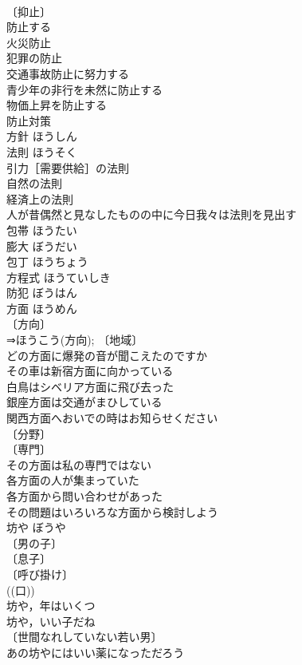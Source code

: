 \documentclass[8pt]{extreport}
\begin{document}
\begin{CJK}{UTF8}{min}
\\	〔抑止〕
\\	防止する 
\\	火災防止 
\\	犯罪の防止 
\\	交通事故防止に努力する 
\\	青少年の非行を未然に防止する 
\\	物価上昇を防止する 
\\	防止対策 
\\	方針	ほうしん	
\\	法則	ほうそく	
\\	引力［需要供給］の法則 
\\	自然の法則 
\\	経済上の法則 
\\	人が昔偶然と見なしたものの中に今日我々は法則を見出す 
\\	包帯	ほうたい	
\\	膨大	ぼうだい	
\\	包丁	ほうちょう	
\\	方程式	ほうていしき	
\\	防犯	ぼうはん	
\\	方面	ほうめん	
\\	〔方向〕
\\	⇒ほうこう(方向); 〔地域〕
\\	どの方面に爆発の音が聞こえたのですか 
\\	その車は新宿方面に向かっている 
\\	白鳥はシベリア方面に飛び去った 
\\	銀座方面は交通がまひしている 
\\	関西方面へおいでの時はお知らせください 
\\	〔分野〕
\\	〔専門〕
\\	その方面は私の専門ではない 
\\	各方面の人が集まっていた 
\\	各方面から問い合わせがあった 
\\	その問題はいろいろな方面から検討しよう 
\\	坊や	ぼうや	
\\	〔男の子〕
\\	〔息子〕
\\	〔呼び掛け〕
\\	((口)) 
\\	坊や，年はいくつ 
\\	坊や，いい子だね 
\\	〔世間なれしていない若い男〕
\\	あの坊やにはいい薬になっただろう 

\end{CJK}
\end{document}
